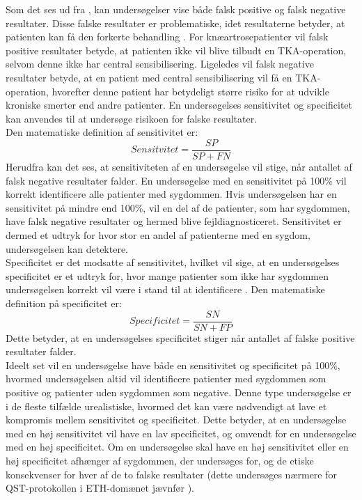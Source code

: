 Som det ses ud fra , kan undersøgelser vise både falsk positive og falsk negative resultater. Disse falske resultater er problematiske, idet resultaterne betyder, at patienten kan få den forkerte behandling \citep{Lalkhen2008}. For knæartrosepatienter vil falsk positive resultater betyde, at patienten ikke vil blive tilbudt en TKA-operation, selvom denne ikke har central sensibilisering. Ligeledes vil falsk negative resultater betyde, at en patient med central sensibilisering vil få en TKA-operation, hvorefter denne patient har betydeligt større risiko for at udvikle kroniske smerter end andre patienter. En undersøgelses sensitivitet og specificitet kan anvendes til at undersøge risikoen for falske resultater. \\
Den matematiske definition af sensitivitet er: \\
\begin{equation}
Sensitvitet=\frac{SP}{SP+FN}
\end{equation}
Herudfra kan det ses, at sensitiviteten af en undersøgelse vil stige, når antallet af falsk negative resultater falder. En undersøgelse med en sensitivitet på 100\% vil korrekt identificere alle patienter med sygdommen. Hvis undersøgelsen har en sensitivitet på mindre end 100\%, vil en del af de patienter, som har sygdommen, have falsk negative resultater og hermed blive fejldiagnosticeret. Sensitivitet er dermed et udtryk for hvor stor en andel af patienterne med en sygdom, undersøgelsen kan detektere. \citep{Lalkhen2008} \\
Specificitet er det modsatte af sensitivitet, hvilket vil sige, at en undersøgelses specificitet er et udtryk for, hvor mange patienter som ikke har sygdommen undersøgelsen korrekt vil være i stand til at identificere \citep{Lalkhen2008}. Den matematiske definition på specificitet er: \\
\begin{equation}
Specificitet=\frac{SN}{SN+FP}
\end{equation}
Dette betyder, at en undersøgelses specificitet stiger når antallet af falske positive resultater falder. \citep{Lalkhen2008} \\
Ideelt set vil en undersøgelse have både en sensitivitet og specificitet på 100\%, hvormed undersøgelsen altid vil identificere patienter med sygdommen som positive og patienter uden sygdommen som negative. Denne type undersøgelse er i de fleste tilfælde urealistiske, hvormed det kan være nødvendigt at lave et kompromis mellem sensitivitet og specificitet. Dette betyder, at en undersøgelse med en høj sensitivitet vil have en lav specificitet, og omvendt for en undersøgelse med en høj specificitet. Om en undersøgelse skal have en høj sensitivitet eller en høj specificitet afhænger af sygdommen, der undersøges for, og de etiske konsekvenser for hver af de to falske resultater (dette undersøges nærmere for QST-protokollen i ETH-domænet jævnfør ). \\
